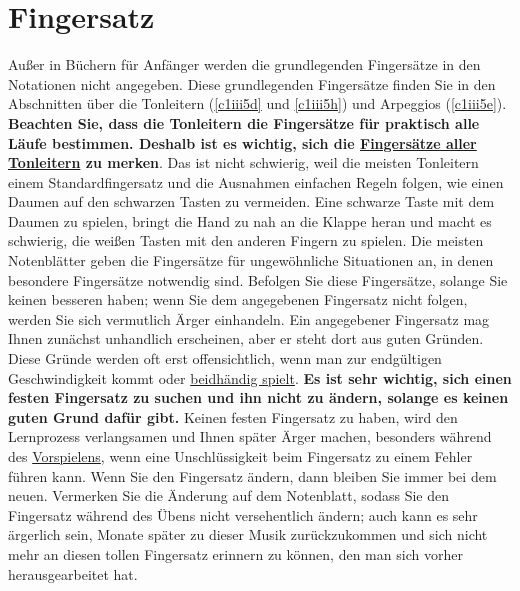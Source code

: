 
\section{Fingersatz}
\label{c1ii18}

Außer in Büchern für Anfänger werden die grundlegenden Fingersätze in den Notationen nicht angegeben.
Diese grundlegenden Fingersätze finden Sie in den Abschnitten über die Tonleitern (\hyperref[c1iii5d]{\ref*{c1iii5d}} und \hyperref[c1iii5h]{\ref*{c1iii5h}}) und Arpeggios (\hyperref[c1iii5e]{\ref*{c1iii5e}}).
\textbf{Beachten Sie, dass die Tonleitern die Fingersätze für praktisch alle Läufe bestimmen.
Deshalb ist es wichtig, sich die \hyperref[table]{Fingersätze aller Tonleitern} zu merken}.
Das ist nicht schwierig, weil die meisten Tonleitern einem Standardfingersatz und die Ausnahmen einfachen Regeln folgen, wie einen Daumen auf den schwarzen Tasten zu vermeiden.
Eine schwarze Taste mit dem Daumen zu spielen, bringt die Hand zu nah an die Klappe heran und macht es schwierig, die weißen Tasten mit den anderen Fingern zu spielen.
Die meisten Notenblätter geben die Fingersätze für ungewöhnliche Situationen an, in denen besondere Fingersätze notwendig sind.
Befolgen Sie diese Fingersätze, solange Sie keinen besseren haben; wenn Sie dem angegebenen Fingersatz nicht folgen, werden Sie sich vermutlich Ärger einhandeln.
Ein angegebener Fingersatz mag Ihnen zunächst unhandlich erscheinen, aber er steht dort aus guten Gründen.
Diese Gründe werden oft erst offensichtlich, wenn man zur endgültigen Geschwindigkeit kommt oder \hyperref[c1ii25]{beidhändig spielt}.
\textbf{Es ist sehr wichtig, sich einen festen Fingersatz zu suchen und ihn nicht zu ändern, solange es keinen guten Grund dafür gibt.}
Keinen festen Fingersatz zu haben, wird den Lernprozess verlangsamen und Ihnen später Ärger machen, besonders während des \hyperref[c1iii14]{Vorspielens}, wenn eine Unschlüssigkeit beim Fingersatz zu einem Fehler führen kann.
Wenn Sie den Fingersatz ändern, dann bleiben Sie immer bei dem neuen.
Vermerken Sie die Änderung auf dem Notenblatt, sodass Sie den Fingersatz während des Übens nicht versehentlich ändern; auch kann es sehr ärgerlich sein, Monate später zu dieser Musik zurückzukommen und sich nicht mehr an diesen tollen Fingersatz erinnern zu können, den man sich vorher herausgearbeitet hat.

